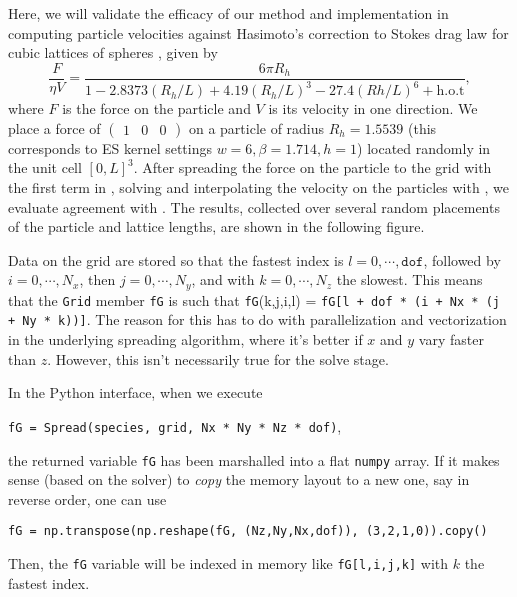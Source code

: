 Here, we will validate the efficacy of our method and implementation in computing particle velocities against Hasimoto's correction to Stokes drag law for cubic lattices of spheres \cite{hasimoto}, given by
\begin{equation}\label{pbccorr}
\displaystyle \frac{F}{\eta V} = \frac{6\pi R_h}{1 - 2.8373(R_h/L) + 4.19(R_h/L)^3 - 27.4(Rh/L)^6 + \text{h.o.t}},
\end{equation}
where $F$ is the force on the particle and $V$ is its velocity in one direction. We place a force of $\begin{pmatrix}1&0&0\end{pmatrix}$ on a particle of radius $R_h = 1.5539$ (this corresponds to ES kernel settings $w=6,\beta = 1.714, h = 1$) located randomly in the unit cell $[0,L]^3$. After spreading the force on the particle to the grid with the first term in , solving  and interpolating the velocity on the particles with , we evaluate agreement with . The results, collected over several random placements of the particle and lattice lengths, are shown in the following figure.


Data on the grid are stored so that the fastest index is $l = 0,\cdots,\texttt{dof}$, followed by $i = 0,\cdots,N_x$, then $j = 0, \cdots, N_y$, and with $k = 0,\cdots ,N_z$ the slowest. This means that the \texttt{Grid} member \texttt{fG} is such that \texttt{fG}(k,j,i,l) = \texttt{fG[l + dof * (i + Nx * (j + Ny * k))]}.
The reason for this has to do with parallelization and vectorization in the underlying spreading algorithm, where it's better if $x$ and $y$ vary faster than $z$. However, this isn't necessarily true for the solve stage. 

In the Python interface, when we execute 

\hspace{10pt} \texttt{fG = Spread(species, grid, Nx * Ny * Nz * dof)}, 

the returned variable \texttt{fG} has been marshalled into a flat \texttt{numpy} array. If it makes sense (based on the solver) to \emph{copy} the memory layout to a new one, say in reverse order, one can use

\hspace{10pt} \texttt{fG = np.transpose(np.reshape(fG, (Nz,Ny,Nx,dof)), (3,2,1,0)).copy()}

Then, the \texttt{fG} variable will be indexed in memory like \texttt{fG[l,i,j,k]} with $k$ the fastest index.

\clearpage
\newpage
{}

%



